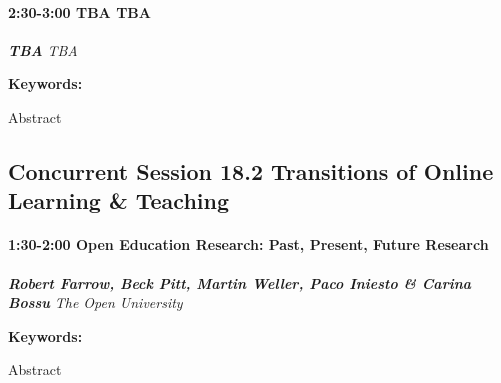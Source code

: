 \documentclass[
]{book}
\begin{document}
\begin{session}
\hypertarget{tba-tba}{%
\paragraph*{\texorpdfstring{2:30-3:00 \textbar{} \textbf{TBA} \textbar{}
TBA}{2:30-3:00 \textbar{} TBA \textbar{} TBA}}\label{tba-tba}}

\textbf{\emph{TBA}} \textbar{} \emph{TBA}

\textbf{Keywords:}

Abstract
\end{session}

\hypertarget{concurrent-session-18.2-transitions-of-online-learning-teaching}{%
\subsection*{Concurrent Session 18.2 \textbar{} Transitions of Online Learning \& Teaching}\label{concurrent-session-18.2-transitions-of-online-learning-teaching}}

\begin{session}
\hypertarget{open-education-research-past-present-future-research}{%
\paragraph*{\texorpdfstring{1:30-2:00 \textbar{} \textbf{Open Education
Research: Past, Present, Future} \textbar{}
Research}{1:30-2:00 \textbar{} Open Education Research: Past, Present, Future \textbar{} Research}}\label{open-education-research-past-present-future-research}}

\textbf{\emph{Robert Farrow, Beck Pitt, Martin Weller, Paco Iniesto \&
Carina Bossu}} \textbar{} \emph{The Open University}

\textbf{Keywords:}

Abstract
\end{session}
\end{document}
